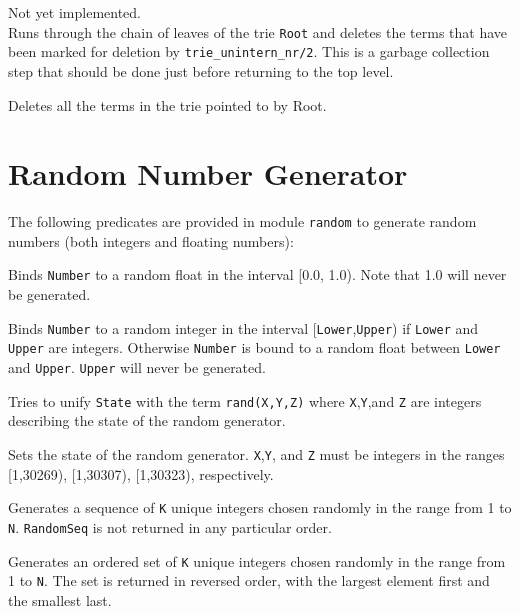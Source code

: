 \begin{description}
Not yet implemented.\\
Runs through the chain of leaves of the trie {\tt Root} and
deletes the terms that have been marked for deletion by
{\tt trie\_unintern\_nr/2}. This is a garbage collection step that should
be done just before returning to the top level.

 
Deletes all the terms in the trie pointed to by Root.


\end{description}



\section{Random Number Generator}

The following predicates are provided in module \texttt{random} to
generate random numbers (both integers and floating numbers):

\begin{description}

 
%
Binds \texttt{Number} to a random float in the interval [0.0, 1.0).
Note that 1.0 will never be generated.

 
    Binds \texttt{Number} to a random integer in the interval
    [\texttt{Lower},\texttt{Upper}) if \texttt{Lower} and \texttt{Upper}
    are integers.  Otherwise \texttt{Number} is bound to a random float
    between \texttt{Lower} and \texttt{Upper}.  \texttt{Upper} will
    never be generated.

 
    Tries to unify \texttt{State} with the term \texttt{rand(X,Y,Z)}
    where \texttt{X},\texttt{Y},and \texttt{Z} are integers describing
    the state of the random generator.

 
    Sets the state of the random generator.  \texttt{X},\texttt{Y}, and
    \texttt{Z} must be integers in the ranges [1,30269), [1,30307),
    [1,30323), respectively.

 
    Generates a sequence of \texttt{K} unique integers chosen randomly
    in the range from 1 to \texttt{N}.  \texttt{RandomSeq} is not
    returned in any particular order.

 
    Generates an ordered set of \texttt{K} unique integers chosen
    randomly in the range from 1 to \texttt{N}.  The set is returned in
    reversed order, with the largest element first and the smallest
    last.

\end{description}



